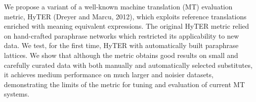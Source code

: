 We propose a variant of a well-known machine translation (MT) evaluation metric, HyTER (Dreyer and Marcu, 2012), which exploits reference translations enriched with meaning equivalent expressions. The original HyTER metric relied on hand-crafted paraphrase networks which restricted its applicability to new data. We test, for the first time, HyTER with automatically built paraphrase lattices. We show that although the metric obtains good results on small and carefully curated data with both manually and automatically selected substitutes, it achieves medium performance on much larger and noisier datasets, demonstrating the limits of the metric for tuning and evaluation of current MT systems.
